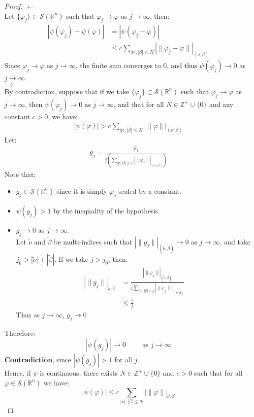 \begin{proof}{}
	$\leftarrow$\\
	Let $\{\varphi_j\}\subset \mathcal{S}(\mathbb{R}^n)$ such that $\varphi_j\rightarrow \varphi$ as $j\rightarrow \infty$, then:
	\begin{align*}
		|\psi(\varphi_j)-\psi(\varphi)|&=|\psi(\varphi_j-\varphi)|\\
		&\leq c\sum_{|\nu|,|\beta|\leq N}|\|\varphi_j-\varphi\||_{(\nu,\beta)}
	\end{align*}
	Since $\varphi_j\rightarrow \varphi$ as $j\rightarrow \infty$, the finite sum converges to $0$, and thus $\psi(\varphi_j)\rightarrow 0$ as $j\rightarrow \infty$.\\
	$\rightarrow$\\
	By contradiction, suppose that if we take $\{\varphi_j\}\subset \mathcal{S}(\mathbb{R}^n)$ such that $\varphi_j\rightarrow \varphi$ as $j\rightarrow \infty$, then $\psi(\varphi_j)\rightarrow 0$ as $j\rightarrow \infty$, and that for all $N\in\mathbb{Z}^+\cup\{0\}$ and any constant $c>0$, we have:
	\begin{align*}
		|\psi(\varphi)|>c\sum_{|\nu|,|\beta|\leq N}|\|\varphi\||_{(\nu,\beta)}
	\end{align*}
	Let:
	\begin{align*}
		g_j=\frac{\varphi_j}{j(\sum_{|\nu|,|\beta|\leq J}|\|\varphi_j\||_{(\nu,\beta)})}
	\end{align*}
	Note that:
	\begin{itemize}
		\item $g_j\in\mathcal{S}(\mathbb{R}^n)$ since it is simply $\varphi_j$ scaled by a constant.
		\item $\psi(g_j)>1$ by the inequality of the hypothesis.
		\item $g_j\rightarrow 0$ as $j\rightarrow \infty$.\\
		  Let $\tilde{\nu}$ and $\tilde{\beta}$ be multi-indices such that $|\|g_j\||_{(\tilde{\nu},\tilde{\beta})}\rightarrow 0$ as $j\rightarrow \infty$, and take $j_0>|\tilde{\nu}|+|\tilde{\beta}|$. If we take $j>j_0$, then:
		\begin{align*}
			|\|g_j\||_{\tilde{\nu},\tilde{\beta}}&=\frac{|\|\varphi_j\||_{(\tilde{\nu},\tilde{\beta})}}{j\sum_{|\nu|,|\beta|\leq j}|\|\varphi_j\||_{(\nu,\beta)}}\\
			&\leq \frac{1}{j}
		\end{align*}
		Thus as $j\rightarrow \infty$, $g_j\rightarrow 0$
	\end{itemize}
	Therefore:
	$$|\psi(g_j)|\rightarrow 0 \hspace{1cm}\text{as $j\rightarrow \infty$}$$
	\textbf{Contradiction}, since $|\psi(g_j)|>1$ for all $j$.\\
	Hence, if $\psi$ is continuous, there exists $N\in\mathbb{Z}^+\cup\{0\}$ and $c>0$ such that for all $\varphi\in\mathcal{S}(\mathbb{R}^n)$ we have:
	$$|\psi(\varphi)|\leq c\sum_{|\nu|,|\beta|\leq N}|\|\varphi\||_{\nu,\beta}$$
\end{proof}
